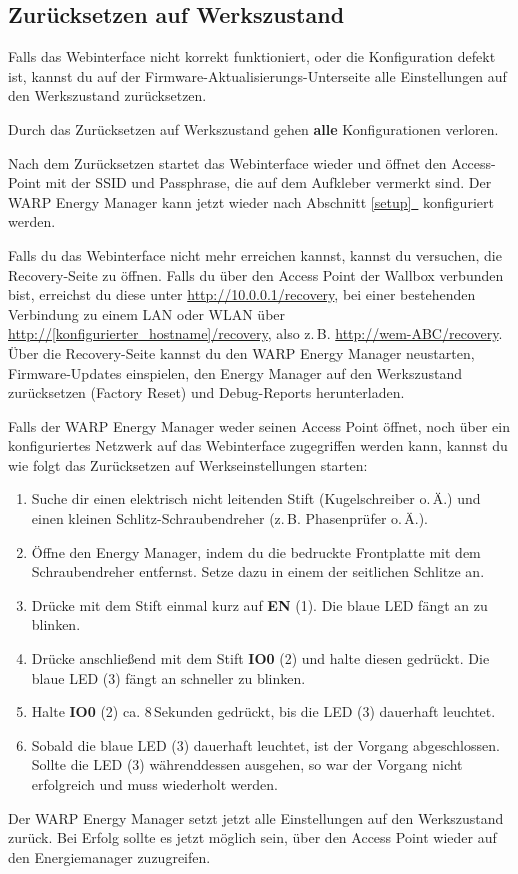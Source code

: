 \documentclass[a4paper,10pt]{article}
\newcommand{\hint}[1]{\begin{tcolorbox}[colback=boxgray,colframe=black,coltext=
white,title=Hinweis,left*=2mm,right*=2mm,boxsep=1mm,bottom=1mm,top=1mm]#1\end{tcolorbox}}
\newcommand*{\fullref}[1]{Abschnitt \hyperref[{#1}]{\ref*{#1}~\nameref*{#1}}}
\begin{document}
\begin{multicols*}{2}
	\subsection{Zurücksetzen auf Werkszustand}\label{reset}
	Falls das Webinterface nicht korrekt funktioniert, oder die Konfiguration defekt ist,
	kannst du auf der Firmware-Aktualisierungs-Unterseite alle Einstellungen auf den Werkszustand zurücksetzen.
	\hint{Durch das Zurücksetzen auf Werkszustand gehen \mbox{\textbf{alle}} Konfigurationen verloren.}
	Nach dem Zurücksetzen startet das Webinterface wieder und öffnet
	den Access-Point mit der SSID und Passphrase, die auf dem Aufkleber vermerkt
	sind. Der WARP Energy Manager kann jetzt wieder nach \fullref{setup} konfiguriert werden.

	Falls du das Webinterface nicht mehr erreichen kannst, kannst du versuchen, die Recovery-Seite zu öffnen.
	Falls du über den Access Point der Wallbox verbunden bist, erreichst du diese unter \url{http://10.0.0.1/recovery},
	bei einer bestehenden Verbindung zu einem LAN oder WLAN über
	\url{http://[konfigurierter_hostname]/recovery}, also z.\,B. \url{http://wem-ABC/recovery}.
	Über die Recovery-Seite kannst du den WARP Energy Manager neustarten, Firmware-Updates einspielen,
	den Energy Manager auf den Werkszustand zurücksetzen (Factory Reset) und Debug-Reports
	herunterladen.

	Falls der WARP Energy Manager weder seinen Access Point öffnet, noch über ein konfiguriertes Netzwerk auf das Webinterface zugegriffen werden kann,
	kannst du wie folgt das Zurücksetzen auf Werkseinstellungen starten:
	\begin{enumerate}
	 \item Suche dir einen elektrisch nicht leitenden Stift (Kugelschreiber o.\,Ä.) und einen kleinen Schlitz-Schraubendreher (z.\,B. Phasenprüfer o.\,Ä.).
	 \item Öffne den Energy Manager, indem du die bedruckte Frontplatte mit dem Schraubendreher entfernst. Setze dazu in einem der seitlichen Schlitze an.
	 \item Drücke mit dem Stift einmal kurz auf \textbf{EN} (1). Die blaue LED fängt an zu blinken.
	 \item Drücke anschließend mit dem Stift \textbf{IO0} (2) und halte diesen gedrückt. Die blaue LED (3) fängt an schneller zu blinken.
	 \item Halte \textbf{IO0} (2) ca. 8\,Sekunden gedrückt, bis die LED (3) dauerhaft leuchtet.
	 \item Sobald die blaue LED (3) dauerhaft leuchtet, ist der Vorgang abgeschlossen. Sollte die LED (3) währenddessen ausgehen, so war der Vorgang nicht erfolgreich und muss wiederholt werden.
	\end{enumerate}
	Der WARP Energy Manager setzt jetzt alle Einstellungen auf den Werkszustand zurück. Bei Erfolg sollte es jetzt möglich sein, über den Access Point wieder auf den Energiemanager zuzugreifen.


\end{multicols*}
\end{document}
